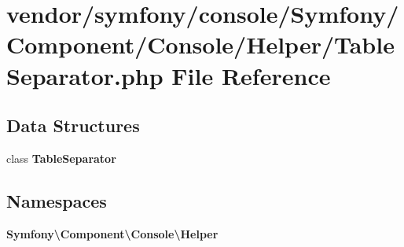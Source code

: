 \section{vendor/symfony/console/\+Symfony/\+Component/\+Console/\+Helper/\+Table\+Separator.php File Reference}
\label{_table_separator_8php}
\subsection*{Data Structures}
\begin{DoxyCompactItemize}
\item 
class {\bf Table\+Separator}
\end{DoxyCompactItemize}
\subsection*{Namespaces}
\begin{DoxyCompactItemize}
\item 
 {\bf Symfony\textbackslash{}\+Component\textbackslash{}\+Console\textbackslash{}\+Helper}
\end{DoxyCompactItemize}
